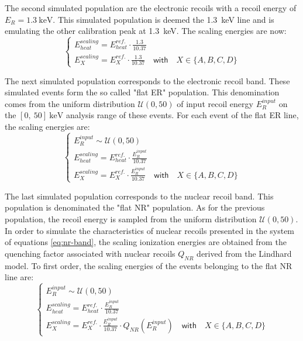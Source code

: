 The second simulated population are the electronic recoils with a recoil energy of $E_R = \SI{1.3}{\kilo\eV}$.  This simulated population is deemed the \SI{1.3}{\kilo\eV} line and is emulating the other calibration peak at \SI{1.3}{\kilo\eV}. The scaling energies are now:
\begin{equation}
\begin{cases}
\displaystyle
E_{heat}^{scaling} = E_{heat}^{ref.} \cdot \frac{1.3}{10.37}
\\
\displaystyle
E_{X}^{scaling} = E_{X}^{ref.} \cdot \frac{1.3}{10.37} \quad \textsf{with} \quad X \in \{A,B,C,D\}
\end{cases}
\end{equation}

The next simulated population corresponds to the electronic recoil band. These simulated events form the so called "flat ER" population. This denomination comes from the uniform distribution $\mathcal{U}(0,50)$ of input recoil energy $E_R^{input}$ on the $[0,\ 50]\ \si{\kilo\eV}$ analysis range of these events.
For each event of the flat ER line, the scaling energies are:
\begin{equation}
\begin{cases}
\displaystyle
E_R^{input} \sim \mathcal{U}(0,50)
\\
\displaystyle
E_{heat}^{scaling} = E_{heat}^{ref.} \cdot \frac{E_R^{input}}{10.37}
\\
\displaystyle
E_{X}^{scaling} = E_{X}^{ref.} \cdot \frac{E_R^{input}}{10.37} \quad \textsf{with} \quad X \in \{A,B,C,D\}
\end{cases}
\end{equation}

The last simulated population corresponds to the nuclear recoil band. This population is denominated the "flat NR" population. As for the previous population, the recoil energy is sampled from the uniform distribution $\mathcal{U}(0,50)$. In order to simulate the characteristics of nuclear recoils presented in the system of equations \ref{eq:nr-band}, the scaling ionization energies are obtained from the quenching factor associated with nuclear recoils $Q_{NR}$ derived from the Lindhard model. To first order, the scaling energies of the events belonging to the flat NR line are:
\begin{equation}
\begin{cases}
\displaystyle 
E_R^{input} \sim \mathcal{U}(0,50)
\\
\displaystyle
E_{heat}^{scaling} = E_{heat}^{ref.} \cdot \frac{E_R^{input}}{10.37}
\\
\displaystyle
E_{X}^{scaling} = E_{X}^{ref.} \cdot \frac{E_R^{input}}{10.37}  \cdot Q_{NR} \left( E_R^{input} \right)
\quad \textsf{with} \quad X \in \{A,B,C,D\}
\end{cases}
\end{equation}

